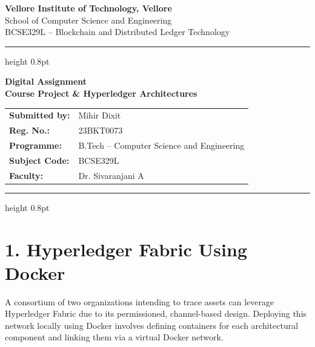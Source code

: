 \documentclass[12pt,a4paper]{article}
\begin{document}
\begin{titlepage}
\centering
\vspace*{1.5cm}
{\Large\bfseries Vellore Institute of Technology, Vellore}\\[0.4cm]
{\normalsize School of Computer Science and Engineering}\\[0.2cm]
{\normalsize BCSE329L -- Blockchain and Distributed Ledger Technology}\\
\vspace{0.3cm}
\hrule height 0.8pt
\vspace{0.8cm}

{\LARGE\bfseries Digital Assignment\\[0.3cm]
Course Project \& Hyperledger Architectures}

\vspace{1.2cm}
\begin{tabular}{ll}
\textbf{Submitted by:}  & Mihir Dixit \\
\textbf{Reg. No.:}      & 23BKT0073 \\
\textbf{Programme:}     & B.Tech -- Computer Science and Engineering \\
\textbf{Subject Code:}  & BCSE329L \\
\textbf{Faculty:}       & Dr. Sivaranjani A \\
\end{tabular}

\vspace*{\fill}
\hrule height 0.8pt
\end{titlepage}

\tableofcontents
\newpage

\section{1. Hyperledger Fabric Using Docker}

A consortium of two organizations intending to trace assets can leverage Hyperledger Fabric due to its permissioned, channel-based design. Deploying this network locally using Docker involves defining containers for each architectural component and linking them via a virtual Docker network.
\end{document}
